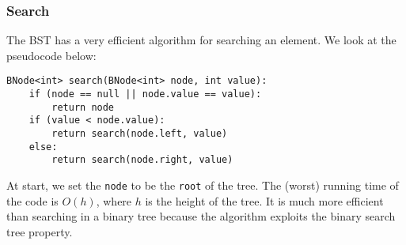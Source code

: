 \documentclass[a4paper, openany]{memoir}
\begin{document}
\subsubsection{Search}
The BST has a very efficient algorithm for searching an element. We look at the pseudocode below:
\begin{lstlisting}[language=pseudocode]
BNode<int> search(BNode<int> node, int value):
    if (node == null || node.value == value):
        return node
    if (value < node.value):
        return search(node.left, value)
    else:
        return search(node.right, value)
\end{lstlisting}
At start, we set the \texttt{node} to be the \texttt{root} of the tree. The (worst) running time of the code is $O(h)$, where $h$ is the height of the tree. It is much more efficient than searching in a binary tree because the algorithm exploits the binary search tree property.
\end{document}

